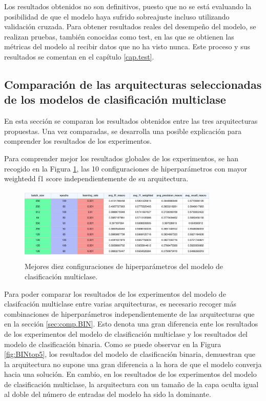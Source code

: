 Los resultados obtenidos no son definitivos, puesto que no se está evaluando la posibilidad de que el modelo haya sufrido sobreajuste incluso utilizando validación cruzada. Para obtener resultados reales del desempeño del modelo, se realizan pruebas, también conocidas como test, en las que se obtienen las métricas del modelo al recibir datos que no ha visto nunca. Este proceso y sus resultados se comentan en el capítulo \ref{cap.test}.


\subsection{Comparación de las arquitecturas seleccionadas de los modelos de clasificación multiclase}\label{sec:comp.MUL}
En esta sección se comparan los resultados obtenidos entre las tres arquitecturas propuestas. Una vez comparadas, se desarrolla una posible explicación para comprender los resultados de los experimentos.

Para comprender mejor los resultados globales de los experimentos, se han recogido en la Figura \ref{fig:MULtop10}, las 10 configuraciones de hiperparámetros con mayor weightedd f1 score independientemente de su arquitectura.

\begin{figure}[H]
    \centering
    \includegraphics[width=0.85\textwidth]{./img/modelo/resultados/MULtop10.pdf}
    \caption{Mejores diez configuraciones de hiperparámetros del modelo de clasificación multiclase.}
    \label{fig:MULtop10}
\end{figure}

Para poder comparar los resultados de los experimentos del modelo de clasifcación multiclase entre varias arquitecturas, es necesario recoger más combinaciones de hiperparámetros independientemente de las arquitecturas que en la sección \ref{sec:comp.BIN}. Esto denota una gran diferencia ente los resultados de los experimentos del modelo de clasificación multiclase y los resultados del modelo de clasificación binaria. Como se puede observar en la Figura \ref{fig:BINtop5}, los resultados del modelo de clasificación binaria, demuestran que la arquitectura no supone una gran diferencia a la hora de que el modelo converja hacia una solución. En cambio, en los resultados de los experimentos del modelo de clasificación multiclase, la arquitectura con un tamaño de la capa oculta igual al doble del número de entradas del modelo ha sido la dominante.

